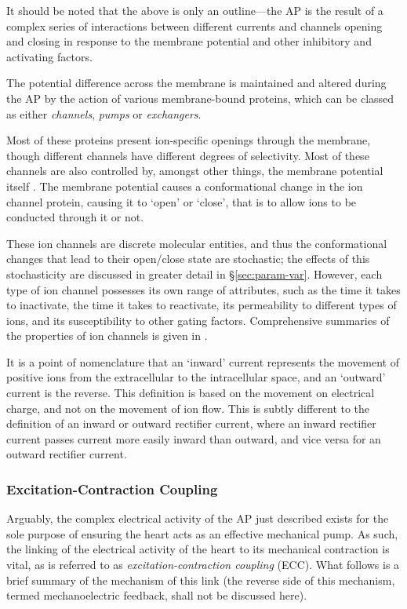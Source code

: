 \documentclass[../thesis-main.tex]{subfiles}
\begin{document}
 It should be noted that the above is only an outline---the AP is the result of a complex series of interactions between different currents and channels opening and closing in response to the membrane potential and other inhibitory and activating factors.
 
 The potential difference across the membrane is maintained and altered during the AP by the action of various membrane-bound proteins, which can be classed as either \emph{channels}, \emph{pumps} or \emph{exchangers}.
 
 Most of these proteins present ion-specific openings through the membrane, though different channels have different degrees of selectivity. Most of these channels are also controlled by, amongst other things, the membrane potential itself \citep{Bezanilla2000}. The membrane potential causes a conformational change in the ion channel protein, causing it to `open' or `close', that is to allow ions to be conducted through it or not.
 
 These ion channels are discrete molecular entities, and thus the conformational changes that lead to their open/close state are stochastic; the effects of this stochasticity are discussed in greater detail in \S\ref{sec:param-var}. However, each type of ion channel possesses its own range of attributes, such as the time it takes to inactivate, the time it takes to reactivate, its permeability to different types of ions, and its susceptibility to other gating factors. Comprehensive summaries of the properties of ion channels is given in \citet{Carmeliet2002, Roden2002}.
 
 It is a point of nomenclature that an `inward' current represents the movement of positive ions from the extracellular to the intracellular space, and an `outward' current is the reverse. This definition is based on the movement on electrical charge, and not on the movement of ion flow. This is subtly different to the definition of an inward or outward rectifier current, where an inward rectifier current passes current more easily inward than outward, and vice versa for an outward rectifier current.
 
 \subsubsection{Excitation-Contraction Coupling}
 \label{subsubsec:ecc}
 Arguably, the complex electrical activity of the AP just described exists for the sole purpose of ensuring the heart acts as an effective mechanical pump. As such, the linking of the electrical activity of the heart to its mechanical contraction is vital, as is referred to as \emph{excitation-contraction coupling} (ECC). What follows is a brief summary of the mechanism of this link (the reverse side of this mechanism, termed mechanoelectric feedback, shall not be discussed here).
 
\end{document}

